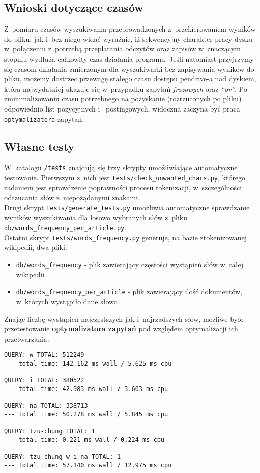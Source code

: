 \documentclass[a4paper,12pt]{article}
\begin{document}
\subsection{Wnioski dotyczące czasów}
Z~pomiaru czasów wyszukiwania przeprowadzonych z~przekierowaniem wyników do
pliku, jak i~bez niego widać wyraźnie, iż sekwencyjny charakter pracy dysku
w~połączeniu z~potrzebą przeplatania odczytów oraz zapisów w~znaczącym stopniu
wydłuża całkowity czas działania programu. Jeśli natomiast przyjrzymy się
czasom działania zmierzonym dla wyszukiwarki bez zapisywania wyników do pliku,
możemy dostrzec przewagę stałego czasu dostępu pendrive-a nad dyskiem, która
najwydatniej ukazuje się w~przypadku zapytań \textit{frazowych} oraz
\textit{``or''}. Po zminimalizowaniu czasu potrzebnego na pozyskanie
(rozrzuconych po pliku) odpowiednio list pozycyjnych i~ postingowych, widoczna
zaczyna być praca \texttt{optymalizatora} zapytań. 

\subsection{Własne testy}
W~katalogu \texttt{/tests} znajdują się trzy skrypty umożliwiające automatyczne
testowanie. Pierwszym z~nich jest \texttt{tests/check\_unwanted\_chars.py}, którego
zadaniem jest sprawdzenie poprawności procesu tokenizacji, w~szczególności
odrzucania słów z~niepożądanymi znakami.\\
Drugi skrypt \texttt{tests/generate\_tests.py} umożliwia automatyczne
sprawdzanie wyników wyszukiwania dla losowo wybranych słów z~pliku\\
\texttt{db/words\_frequency\_per\_article.py}.\\
Ostatni skrypt \texttt{tests/words\_frequency.py} generuje, na bazie
ztokenizowanej wikipedii, dwa pliki:
\begin{itemize}
	\item \texttt{db/words\_frequency} - plik zawierający częstości wystąpień
		słów w~całej wikipedii
	\item \texttt{db/words\_frequency\_per\_article} - plik zawierający ilość
		dokumentów, w~których wystąpiło dane słowo
\end{itemize}
Znając liczbę wystąpień najczęstszych jak i~najrzadszych słów, możliwe było
przetestowanie \textbf{optymalizatora zapytań} pod względem optymalizacji ich
przetwarzania:
\begin{verbatim}
QUERY: w TOTAL: 512249
--- total time: 142.162 ms wall / 5.625 ms cpu

QUERY: i TOTAL: 380522
--- total time: 42.983 ms wall / 3.603 ms cpu

QUERY: na TOTAL: 338713
--- total time: 50.278 ms wall / 5.845 ms cpu

QUERY: tzu-chung TOTAL: 1
--- total time: 0.221 ms wall / 0.224 ms cpu

QUERY: tzu-chung w i na TOTAL: 1
--- total time: 57.140 ms wall / 12.975 ms cpu
\end{verbatim}
\end{document}
